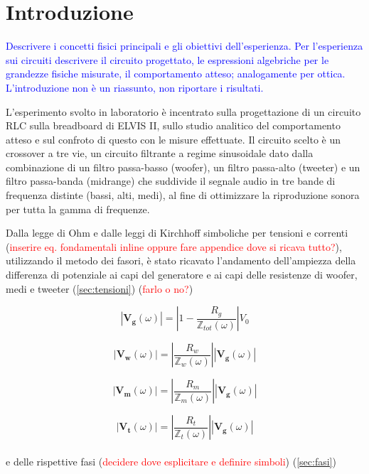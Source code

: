 \documentclass[12pt,italian]{article}
\newcommand{\prof}[1]{\textcolor{blue}{#1}}
\newcommand{\err}[1]{\textcolor{red}{#1}}
\begin{document}
\section*{Introduzione}
\prof{ Descrivere i concetti fisici principali e gli obiettivi dell'esperienza.
  Per l'esperienza sui circuiti descrivere il circuito progettato, le
  espressioni algebriche per le grandezze fisiche misurate, il comportamento
  atteso; analogamente per ottica. L'introduzione non è un riassunto, non
  riportare i risultati.}

L'esperimento svolto in laboratorio è incentrato sulla progettazione di un
circuito RLC sulla breadboard di ELVIS II, sullo studio analitico del
comportamento atteso e sul confroto di questo con le misure effettuate. Il
circuito scelto è un crossover a tre vie, un circuito filtrante a regime
sinusoidale dato dalla combinazione di un filtro passa-basso (woofer), un
filtro passa-alto (tweeter) e un filtro passa-banda (midrange) che suddivide il
segnale audio in tre bande di frequenza distinte (bassi, alti, medi), al fine
di ottimizzare la riproduzione sonora per tutta la gamma di frequenze.

Dalla legge di Ohm e dalle leggi di Kirchhoff simboliche per tensioni e
correnti (\err{inserire eq. fondamentali inline oppure fare appendice dove si
  ricava tutto?}), utilizzando il metodo dei fasori, è stato ricavato l'andamento
dell'ampiezza della differenza di potenziale ai capi del generatore e ai capi
delle resistenze di woofer, medi e tweeter (\ref{sec:tensioni}) (\err{farlo o
  no?})

\begin{equation}
  \left| \mathbf{V_{g}}(\omega) \right| = \left| 1 - \frac{R_g}
  {\mathbb{Z}_{tot}(\omega)}\right| V_{0}
  \label{eq:Vg}
\end{equation}

\begin{equation}
  \left| \mathbf{V_{w}}(\omega) \right| = \left| \frac{R_{w}}
  {\mathbb{Z}_{w}(\omega)}\right|\left| \mathbf{V_{g}}(\omega) \right|
  \label{eq:Vw}
\end{equation}

\begin{equation}
  \left| \mathbf{V_{m}}(\omega) \right| = \left| \frac{R_{m}}
  {\mathbb{Z}_{m}(\omega)}\right|\left| \mathbf{V_{g}}(\omega) \right|
  \label{eq:Vm}
\end{equation}

\begin{equation}
  \left| \mathbf{V_{t}}(\omega) \right| = \left| \frac{R_{t}}
  {\mathbb{Z}_{t}(\omega)}\right|\left| \mathbf{V_{g}}(\omega) \right|
  \label{eq:Vt}
\end{equation}
\\
e delle rispettive fasi (\err{decidere dove esplicitare e definire simboli}) (\ref{sec:fasi})
\end{document}
